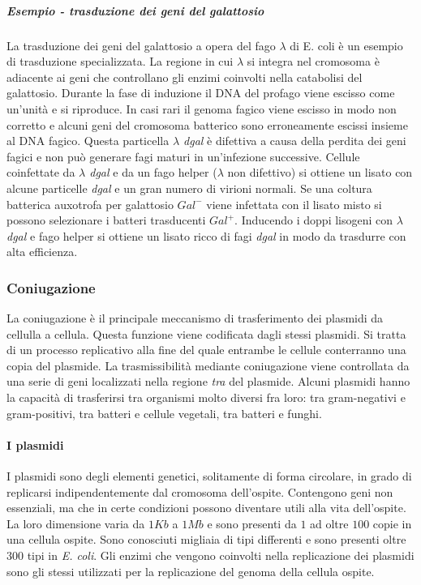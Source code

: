 				\subparagraph{Esempio - trasduzione dei geni del galattosio}
				La trasduzione dei geni del galattosio a opera del fago $\lambda$ di E. coli \`e un esempio di trasduzione specializzata.
				La regione in cui $\lambda$ si integra nel cromosoma \`e adiacente ai geni che controllano gli enzimi coinvolti nella catabolisi del galattosio.
				Durante la fase di induzione il DNA del profago viene escisso come un'unit\`a e si riproduce.
				In casi rari il genoma fagico viene escisso in modo non corretto e alcuni geni del cromosoma batterico sono erroneamente escissi insieme al DNA fagico.
				Questa particella \emph{$\lambda$ dgal} \`e difettiva a causa della perdita dei geni fagici e non pu\`o generare fagi maturi in un'infezione successive.
				Cellule coinfettate da \emph{$\lambda$ dgal} e da un fago helper ($\lambda$ non difettivo) si ottiene un lisato con alcune particelle \emph{dgal} e un gran numero di virioni normali.
				Se una coltura batterica auxotrofa per galattosio \emph{$Gal^-$} viene infettata con il lisato misto si possono selezionare i batteri trasducenti \emph{$Gal^+$}.
				Inducendo i doppi lisogeni con \emph{$\lambda$ dgal} e fago helper si ottiene un lisato ricco di fagi \emph{dgal} in modo da trasdurre con alta efficienza.

		\subsubsection{Coniugazione}
		La coniugazione è il principale meccanismo di trasferimento dei plasmidi da cellulla a cellula. 
		Questa funzione viene codificata dagli stessi plasmidi. 
		Si tratta di un processo replicativo alla fine del quale entrambe le cellule conterranno una copia del plasmide. 
		La trasmissibilità mediante coniugazione viene controllata da una serie di geni localizzati nella regione \textit{tra} del plasmide. 
		Alcuni plasmidi hanno la capacità di trasferirsi tra organismi molto diversi fra loro: tra gram-negativi e gram-positivi, tra batteri e cellule vegetali, tra batteri e funghi.

			\paragraph{I plasmidi}
			I plasmidi sono degli elementi genetici, solitamente di forma circolare, in grado di replicarsi indipendentemente dal cromosoma dell'ospite.
			Contengono geni non essenziali, ma che in certe condizioni possono diventare utili alla vita dell'ospite. 
			La loro dimensione varia da $1Kb$ a $1 Mb$ e sono presenti da $1$ ad oltre $100$ copie in una cellula ospite. 
			Sono conosciuti migliaia di tipi differenti e sono presenti oltre $300$ tipi in \textit{E. coli}. 
			Gli enzimi che vengono coinvolti nella replicazione dei plasmidi sono gli stessi utilizzati per la replicazione del genoma della cellula ospite.

